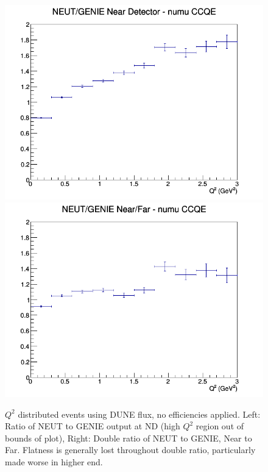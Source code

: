 \documentclass[12pt]{article}
\begin{document}
\newline
\begin{figure}[h]
\includegraphics[width=\linewidth]{eff_Q2_ratios/CCQE_NEUT_GENIE_numu_near_Q2.png}
\endminipage
{}
\includegraphics[width=\linewidth]{eff_Q2_ratios/CCQE_NEUT_GENIE_numu_NF_Q2.png}
\endminipage
\caption{$Q^2$ distributed events using DUNE flux, no efficiencies applied. Left: Ratio of NEUT to GENIE output at ND (high $Q^2$ region out of bounds of plot), Right: Double ratio of NEUT to GENIE, Near to Far. Flatness is generally lost throughout double ratio, particularly made worse in higher end.}
\end{figure}
\FloatBarrier
\end{document}
